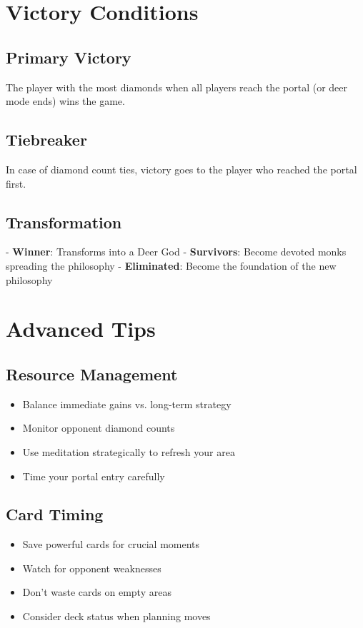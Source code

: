 \documentclass[12pt,a4paper]{article}
\begin{document}
\section{Victory Conditions}

\subsection{Primary Victory}
The player with the most diamonds when all players reach the portal (or deer mode ends) wins the game.

\subsection{Tiebreaker}
In case of diamond count ties, victory goes to the player who reached the portal first.

\subsection{Transformation}
- \textbf{Winner}: Transforms into a Deer God
- \textbf{Survivors}: Become devoted monks spreading the philosophy  
- \textbf{Eliminated}: Become the foundation of the new philosophy

\section{Advanced Tips}

\subsection{Resource Management}
\begin{itemize}
    \item Balance immediate gains vs. long-term strategy
    \item Monitor opponent diamond counts
    \item Use meditation strategically to refresh your area
    \item Time your portal entry carefully
\end{itemize}

\subsection{Card Timing}
\begin{itemize}
    \item Save powerful cards for crucial moments
    \item Watch for opponent weaknesses
    \item Don't waste cards on empty areas
    \item Consider deck status when planning moves
\end{itemize}
\end{document}

